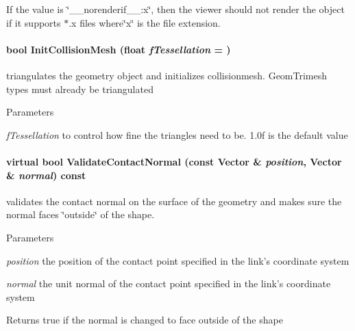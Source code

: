 If the value is \char`\"{}\_\-\_\-norenderif\_\-\_\-:x\char`\"{}, then the viewer should not render the object if it supports $\ast$.x files where\char`\"{}x\char`\"{} is the file extension. \hypertarget{classOpenRAVE_1_1KinBody_1_1Link_1_1GEOMPROPERTIES_a77e9273e5d79606152b85b4863f3b6b4}{
\paragraph[{InitCollisionMesh}]{\setlength{\rightskip}{0pt plus 5cm}bool InitCollisionMesh (float {\em fTessellation} = {})}\hfill}
\label{classOpenRAVE_1_1KinBody_1_1Link_1_1GEOMPROPERTIES_a77e9273e5d79606152b85b4863f3b6b4}
triangulates the geometry object and initializes collisionmesh. GeomTrimesh types must already be triangulated 
\begin{DoxyParams}{Parameters}
\item[{\em fTessellation}]to control how fine the triangles need to be. 1.0f is the default value \end{DoxyParams}
\hypertarget{classOpenRAVE_1_1KinBody_1_1Link_1_1GEOMPROPERTIES_a80c6877ca0a3b0f5104b00ccfbc7b591}{
\paragraph[{ValidateContactNormal}]{\setlength{\rightskip}{0pt plus 5cm}virtual bool ValidateContactNormal (const Vector \& {\em position}, \/  Vector \& {\em normal}) const}\hfill}
\label{classOpenRAVE_1_1KinBody_1_1Link_1_1GEOMPROPERTIES_a80c6877ca0a3b0f5104b00ccfbc7b591}


validates the contact normal on the surface of the geometry and makes sure the normal faces \char`\"{}outside\char`\"{} of the shape. 


\begin{DoxyParams}{Parameters}
\item[{\em position}]the position of the contact point specified in the link's coordinate system \item[{\em normal}]the unit normal of the contact point specified in the link's coordinate system \end{DoxyParams}
\begin{DoxyReturn}{Returns}
true if the normal is changed to face outside of the shape 
\end{DoxyReturn}



